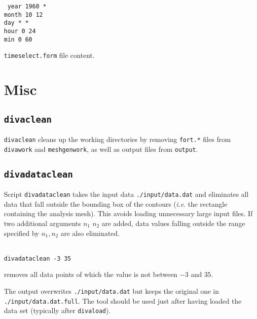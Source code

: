 \begin{exfile}[H]
\begin{footnotesize}
\texttt{
year 1960 *\\
month 10 12\\
day * *\\
hour 0 24\\
min 0 60
}
\end{footnotesize}
\caption{{\tt timeselect.form} file content.} 
\end{exfile}






\section{Misc}

\subsection{\texttt{divaclean}}

\texttt{divaclean} cleans up the working directories by removing \texttt{fort.*} files from \texttt{divawork} and \texttt{meshgenwork}, as well as output files from \texttt{output}.

\subsection{\texttt{divadataclean}}

Script \texttt{divadataclean} takes the input data \texttt{./input/data.dat} and eliminates all data that fall outside the bounding box of the contours (\textit{i.e.} the rectangle containing the analysis mesh). This avoids loading unnecessary large input files. If two additional arguments $n_{1}$ $n_{2}$ are added, data values falling outside the range specified by $n_{1},n_{2}$ are also eliminated.

\example\\
\texttt{divadataclean -3 35} \qquad \begin{minipage}[t]{.65\textwidth}removes all data points of which the value is not between $-3$ and $35$.\end{minipage} 

The output overwrites \texttt{./input/data.dat} but keeps the original one in \texttt{./\-input/\-data\-.dat\-.full}. The tool should be used just after having loaded the data set (typically after \texttt{divaload}).

